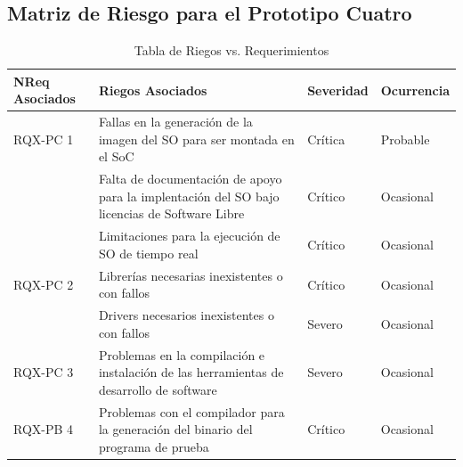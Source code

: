 		
\subsection{Matriz de Riesgo para el Prototipo Cuatro} 

		\begin{table}[h!]
		\centering
		\begin{tabular}{ p{2.5cm} p{9cm} p{2cm} p{2cm} }
		\hline 
		\rowcolor[gray]{0.8} N\textordmasculine Req Asociados  & Riegos Asociados & Severidad  & Ocurrencia \\
		\hline RQX-PC 1 & Fallas en la generación de la imagen del SO para ser montada en el SoC & Crítica       & Probable \\
		\hline			& Falta de documentación de apoyo para la implentación del SO bajo licencias de Software Libre & Crítico & Ocasional\\	
		\hline			& Limitaciones para la ejecución de SO de tiempo real & Crítico & Ocasional\\	
 		\hline RQX-PC 2 & Librerías necesarias inexistentes o con fallos& Crítico & Ocasional\\	
		\hline			& Drivers necesarios inexistentes o con fallos  & Severo  &  Ocasional\\ 
		\hline RQX-PC 3	& Problemas en la compilación e instalación de las herramientas de desarrollo de software& Severo  &  Ocasional\\ 
		\hline RQX-PB 4 & Problemas con el compilador para la generación del binario del programa de prueba  & Crítico&  Ocasional\\
		\hline
		\end{tabular}
		\caption{Tabla de Riegos vs. Requerimientos}
		\end{table}

		\newpage

